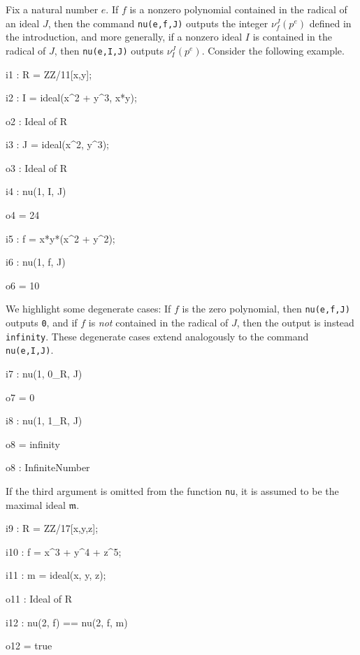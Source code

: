 \documentclass{amsart}
\newcommand{\idealm}{\mathfrak{m}}
\begin{document}
Fix a natural number $e$.  If $f$ is a nonzero polynomial contained in the radical of an ideal $J$, then the command {\tt nu(e,f,J)} outputs the integer $\nu_f^J(p^e)$ defined in the introduction, and
more generally, if a nonzero ideal $I$ is contained in the radical of $J$, then {\tt nu(e,I,J)} outputs $\nu_I^J(p^e)$. Consider the following example.  %

{\small
{}
\begin{MyVerbatim}

i1 : R = ZZ/11[x,y];

i2 : I = ideal(x^2 + y^3, x*y);

o2 : Ideal of R

i3 : J = ideal(x^2, y^3);

o3 : Ideal of R

i4 : nu(1, I, J)

o4 = 24

i5 : f = x*y*(x^2 + y^2);

i6 : nu(1, f, J)

o6 = 10
\end{MyVerbatim}
}
\medspace


We highlight some degenerate cases:  If $f$ is the zero polynomial, then {\tt nu(e,f,J)} outputs {\tt 0}, and if $f$ is \emph{not} contained in the radical of $J$, then the output is instead {\tt infinity}.  These degenerate cases extend analogously to the command {\tt nu(e,I,J)}.

{\small
{}
\begin{MyVerbatim}

i7 : nu(1, 0_R, J)

o7 = 0

i8 : nu(1, 1_R, J)

o8 = infinity

o8 : InfiniteNumber
\end{MyVerbatim}
}
\medspace


If the third argument is omitted from the function {\tt nu}, it is assumed to be the maximal ideal $\idealm$.

{\small
{}
\begin{MyVerbatim}

i9 : R = ZZ/17[x,y,z];

i10 : f = x^3 + y^4 + z^5;

i11 : m = ideal(x, y, z);

o11 : Ideal of R

i12 : nu(2, f) == nu(2, f, m)

o12 = true
\end{MyVerbatim}
}
\medspace
\end{document}
